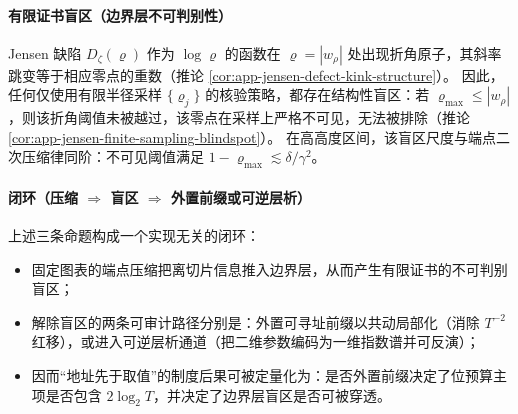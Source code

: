 \paragraph{有限证书盲区（边界层不可判别性）}
Jensen 缺陷 \(D_\zeta(\varrho)\) 作为 \(\log\varrho\) 的函数在 \(\varrho=|w_\rho|\) 处出现折角原子，其斜率跳变等于相应零点的重数（推论 \ref{cor:app-jensen-defect-kink-structure}）。
因此，任何仅使用有限半径采样 \(\{\varrho_j\}\) 的核验策略，都存在结构性盲区：若 \(\varrho_{\max}\le |w_\rho|\)，则该折角阈值未被越过，该零点在采样上严格不可见，无法被排除（推论 \ref{cor:app-jensen-finite-sampling-blindspot}）。
在高高度区间，该盲区尺度与端点二次压缩律同阶：不可见阈值满足 \(1-\varrho_{\max}\lesssim \delta/\gamma^2\)。

\paragraph{闭环（压缩 \texorpdfstring{$\Rightarrow$}{=>} 盲区 \texorpdfstring{$\Rightarrow$}{=>} 外置前缀或可逆层析）}
上述三条命题构成一个实现无关的闭环：
\begin{itemize}
  \item 固定图表的端点压缩把离切片信息推入边界层，从而产生有限证书的不可判别盲区；
  \item 解除盲区的两条可审计路径分别是：外置可寻址前缀以共动局部化（消除 \(T^{-2}\) 红移），或进入可逆层析通道（把二维参数编码为一维指数谱并可反演）；
  \item 因而“地址先于取值”的制度后果可被定量化为：是否外置前缀决定了位预算主项是否包含 \(2\log_2T\)，并决定了边界层盲区是否可被穿透。
\end{itemize}

\endinput

